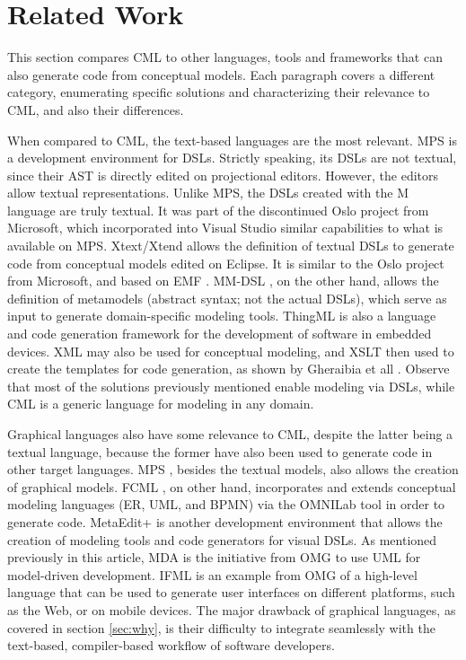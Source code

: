 \section{Related Work}\label{sec:related}

This section compares CML to other languages, tools and frameworks
that can also generate code from conceptual models.
Each paragraph covers a different category,
enumerating specific solutions and characterizing their relevance to CML,
and also their differences.

When compared to CML, the text-based languages are the most relevant.
MPS \cite{voelter} is a development environment for DSLs.
Strictly speaking, its DSLs are not textual,
since their AST is directly edited on projectional editors.
However, the editors allow textual representations.
Unlike MPS,
the DSLs created with the M language \cite{mlang} are truly textual.
It was part of the discontinued Oslo project from Microsoft,
which incorporated into Visual Studio similar capabilities to what is available on MPS.
Xtext/Xtend \cite{xtext} allows the definition of textual DSLs
to generate code from conceptual models edited on Eclipse.
It is similar to the Oslo project from Microsoft,
and based on EMF \cite{emf}.
MM-DSL \cite{mm-dsl}, on the other hand,
allows the definition of metamodels (abstract syntax; not the actual DSLs),
which serve as input to generate domain-specific modeling tools.
ThingML \cite{thingml} is also a language and code generation framework for
the development of software in embedded devices.
XML may also be used for conceptual modeling,
and XSLT then used to create the templates for code generation,
as shown by Gheraibia et all \cite{xslt}.
Observe that most of the solutions previously mentioned enable modeling via DSLs,
while CML is a generic language for modeling in any domain.

Graphical languages also have some relevance to CML,
despite the latter being a textual language,
because the former have also been used to generate code in other target languages.
MPS \cite{voelter},
besides the textual models,
also allows the creation of graphical models.
FCML \cite{fcml}, on other hand,
incorporates and extends conceptual modeling languages (ER, UML, and BPMN)
via the OMNILab tool in order to generate code.
MetaEdit+ \cite{metaedit} is another development environment
that allows the creation of modeling tools
and code generators for visual DSLs.
As mentioned previously in this article,
MDA \cite{mda} is the initiative from OMG
to use UML \cite{uml} for model-driven development.
IFML \cite{ifml} is an example from OMG of a high-level language
that can be used to generate user interfaces on different platforms,
such as the Web, or on mobile devices.
The major drawback of graphical languages,
as covered in section \ref{sec:why},
is their difficulty to integrate seamlessly with the text-based,
compiler-based workflow of software developers.

